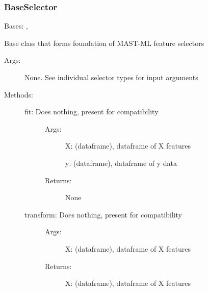 \documentclass[letterpaper,10pt,english]{sphinxmanual}
\begin{document}
\subsubsection{BaseSelector}
\label{\detokenize{api/mastml.feature_selectors.BaseSelector:baseselector}}\label{\detokenize{api/mastml.feature_selectors.BaseSelector::doc}}

\begin{fulllineitems}
\label{\detokenize{api/mastml.feature_selectors.BaseSelector:mastml.feature_selectors.BaseSelector}}
Bases: , 

Base class that forms foundation of MAST-ML feature selectors
\begin{description}
\item[{Args:}] \leavevmode
None. See individual selector types for input arguments

\item[{Methods:}] \leavevmode\begin{description}
\item[{fit: Does nothing, present for compatibility}] \leavevmode\begin{description}
\item[{Args:}] \leavevmode
X: (dataframe), dataframe of X features

y: (dataframe), dataframe of y data

\item[{Returns:}] \leavevmode
None

\end{description}

\item[{transform: Does nothing, present for compatibility}] \leavevmode\begin{description}
\item[{Args:}] \leavevmode
X: (dataframe), dataframe of X features

\item[{Returns:}] \leavevmode
X: (dataframe), dataframe of X features

\end{description}

\end{description}


\end{description}
\end{fulllineitems}
\end{document}
